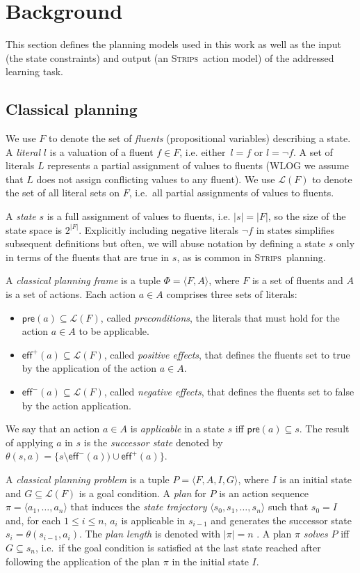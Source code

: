 \documentclass{article}
\newcommand{\tup}[1]{{\langle #1 \rangle}}
\newcommand{\pre}{\mathsf{pre}}     %
\newcommand{\eff}{\mathsf{eff}}     %
\newcommand{\strips}{\textsc{Strips}}     %
\begin{document}
\section{Background}
This section defines the planning models used in this work as well as the input (the state constraints) and output (an \strips\ action model) of the addressed learning task.

\subsection{Classical planning}
We use $F$ to denote the set of {\em fluents} (propositional variables) describing a state. A {\em literal} $l$ is a valuation of a fluent $f\in F$, i.e. either~$l=f$ or $l=\neg f$. A set of literals $L$ represents a partial assignment of values to fluents (WLOG we assume that $L$ does not assign conflicting values to any fluent). We use $\mathcal{L}(F)$ to denote the set of all literal sets on $F$, i.e.~all partial assignments of values to fluents.

A {\em state} $s$ is a full assignment of values to fluents, i.e. $|s|=|F|$, so the size of the state space is $2^{|F|}$. Explicitly including negative literals $\neg f$ in states simplifies subsequent definitions but often, we will abuse notation by defining a state $s$ only in terms of the fluents that are true in $s$, as is common in \strips\ planning.

A {\em classical planning frame} is a tuple $\Phi=\tup{F,A}$, where $F$ is a set of fluents and $A$ is a set of actions. Each action $a\in A$ comprises three sets of literals:
\begin{itemize}
\item $\pre(a)\subseteq\mathcal{L}(F)$, called {\em preconditions}, the literals that must hold for the action $a\in A$ to be applicable.
\item $\eff^+(a)\subseteq\mathcal{L}(F)$, called {\em positive effects}, that defines the fluents set to true by the application of the action $a\in A$.
\item $\eff^-(a)\subseteq\mathcal{L}(F)$, called {\em negative effects}, that defines the fluents set to false by the action application.
\end{itemize}
We say that an action $a\in A$ is {\em applicable} in a state $s$ iff $\pre(a)\subseteq s$. The result of applying $a$ in $s$ is the {\em successor state} denoted by $\theta(s,a)=\{s\setminus\eff^-(a))\cup\eff^+(a)\}$.

A {\em classical planning problem} is a tuple $P=\tup{F,A,I,G}$, where $I$ is an initial state and $G\subseteq\mathcal{L}(F)$ is a goal condition. A {\em plan} for $P$ is an action sequence $\pi=\tup{a_1, \ldots, a_n}$ that induces the {\em state trajectory} $\tup{s_0, s_1, \ldots, s_n}$ such that $s_0=I$ and, for each {\small $1\leq i\leq n$}, $a_i$ is applicable in $s_{i-1}$ and generates the successor state $s_i=\theta(s_{i-1},a_i)$. The {\em plan length} is denoted with $|\pi|=n$ . A plan $\pi$ {\em solves} $P$ iff $G\subseteq s_n$, i.e.~if the goal condition is satisfied at the last state reached after following the application of the plan $\pi$ in the initial state $I$.
\end{document}

